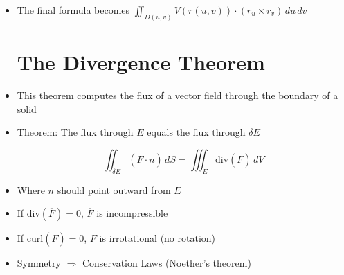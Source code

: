 \begin{itemize}
\begin{itemize}
    \end{itemize}

  \item The final formula becomes $\displaystyle \iint_{D(u,v)} V(\overline{r}(u,v))\cdot (\overline{r}_u\times\overline{r}_v)\,du\,dv$

    \section{The Divergence Theorem}

  \item This theorem computes the flux of a vector field through the boundary of a solid

  \item Theorem: The flux through $E$ equals the flux through $\delta E$

    $$\iint_{\delta E} (\overline{F}\cdot\overline{n})\,dS=\iiint_E \text{div}(\overline{F})\,dV$$

  \item Where $\overline{n}$ should point outward from $E$

  \item If div$(\overline{F})=0$, $\overline{F}$ is incompressible

  \item If curl$(\overline{F})=0$, $\overline{F}$ is irrotational (no rotation)

  \item Symmetry $\Rightarrow$ Conservation Laws (Noether's theorem)

\end{itemize}




